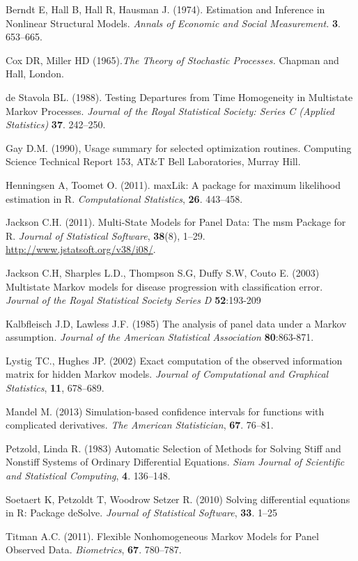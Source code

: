 \documentclass{article}
\numberwithin{equation}{section}
\begin{document}
\begin{thebibliography}{unsrt}

 Berndt E, Hall B, Hall R, Hausman J. (1974). Estimation and Inference in Nonlinear Structural Models. {\it Annals of Economic and Social Measurement.} {\bf 3}. 653--665.

 Cox DR, Miller HD (1965).{\it The Theory of Stochastic Processes.} Chapman and Hall, London.

 de Stavola BL. (1988). Testing Departures from Time Homogeneity in Multistate Markov Processes. {\it Journal of the Royal Statistical Society: Series C (Applied Statistics)} {\bf 37}. 242--250.

 Gay D.M. (1990), Usage summary for selected optimization routines. Computing Science Technical Report 153, AT\&T Bell Laboratories, Murray Hill.

 Henningsen A, Toomet O. (2011). maxLik: A package for maximum likelihood estimation in R.  {\it Computational Statistics}, {\bf 26}. 443--458.


 Jackson C.H. (2011). Multi-State Models for Panel Data: The msm Package for R. {\it Journal of Statistical Software}, {\bf 38}(8), 1--29. \url{http://www.jstatsoft.org/v38/i08/}.

 Jackson C.H, Sharples L.D., Thompson S.G, Duffy S.W, Couto E. (2003) Multistate Markov models for disease progression with classification error. {\it Journal of the Royal Statistical Society Series D} {\bf 52}:193-209

 Kalbfleisch J.D, Lawless J.F. (1985) The analysis of panel data under a Markov assumption. {\it Journal of the American Statistical Association} {\bf 80}:863-871.

 Lystig TC., Hughes JP. (2002) Exact computation of the observed information matrix for hidden Markov models. {\it Journal of Computational and Graphical Statistics}, {\bf 11}, 678--689. 

 Mandel M. (2013) Simulation-based confidence intervals for functions with complicated derivatives. {\it The American Statistician}, {\bf 67}. 76--81.

 Petzold, Linda R. (1983) Automatic Selection of Methods for Solving Stiff and Nonstiff Systems of Ordinary Differential Equations. {\it Siam Journal of Scientific and Statistical Computing}, {\bf 4}. 136--148.

 Soetaert K, Petzoldt T, Woodrow Setzer R. (2010) Solving differential equations in R: Package deSolve. {\it Journal of Statistical Software}, {\bf 33}. 1--25

 Titman A.C. (2011). Flexible Nonhomogeneous Markov Models for Panel Observed Data. {\it Biometrics}, {\bf 67}. 780--787.

\end{thebibliography}
\end{document}
